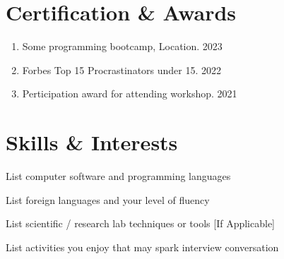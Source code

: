 \documentclass[11pt]{article} %
\begin{document}
\section{Certification \& Awards}
\begin{enumerate}[label=\null, left=0pt..0pt, itemsep=0pt]
        \item Some programming bootcamp, Location. \hfill 2023
        \item Forbes Top 15 Procrastinators under 15. \hfill 2022
        \item Perticipation award for attending workshop. \hfill 2021
\end{enumerate}

\section{Skills \& Interests}
\begin{description}[itemsep=0pt]
        \item[Technical] List computer software and programming languages
        \item[Language] List foreign languages and your level of fluency
        \item[Laboratory] List scientific / research lab techniques or tools [If Applicable]
        \item[Interests] List activities you enjoy that may spark interview conversation
\end{description}
\end{document}
